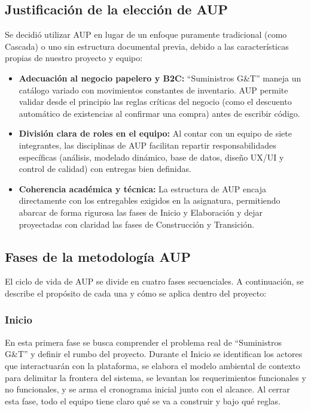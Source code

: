 \subsection{Justificación de la elección de AUP}
Se decidió utilizar AUP en lugar de un enfoque puramente tradicional (como Cascada) o uno sin estructura documental previa, debido a las características propias de nuestro proyecto y equipo:
\begin{itemize}
    \item \textbf{Adecuación al negocio papelero y B2C:} ``Suministros G\&T'' maneja un catálogo variado con movimientos constantes de inventario. AUP permite validar desde el principio las reglas críticas del negocio (como el descuento automático de existencias al confirmar una compra) antes de escribir código.
    \item \textbf{División clara de roles en el equipo:} Al contar con un equipo de siete integrantes, las disciplinas de AUP facilitan repartir responsabilidades específicas (análisis, modelado dinámico, base de datos, diseño UX/UI y control de calidad) con entregas bien definidas.
    \item \textbf{Coherencia académica y técnica:} La estructura de AUP encaja directamente con los entregables exigidos en la asignatura, permitiendo abarcar de forma rigurosa las fases de Inicio y Elaboración y dejar proyectadas con claridad las fases de Construcción y Transición.
\end{itemize}

\subsection{Fases de la metodología AUP}
El ciclo de vida de AUP se divide en cuatro fases secuenciales. A continuación, se describe el propósito de cada una y cómo se aplica dentro del proyecto:

\subsubsection{Inicio}
En esta primera fase se busca comprender el problema real de ``Suministros G\&T'' y definir el rumbo del proyecto. Durante el Inicio se identifican los actores que interactuarán con la plataforma, se elabora el modelo ambiental de contexto para delimitar la frontera del sistema, se levantan los requerimientos funcionales y no funcionales, y se arma el cronograma inicial junto con el alcance. Al cerrar esta fase, todo el equipo tiene claro qué se va a construir y bajo qué reglas.

